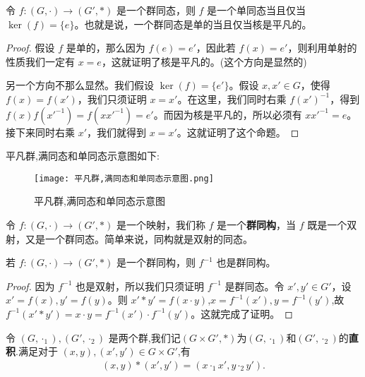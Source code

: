 \documentclass[../../main.tex]{subfiles}
\begin{document}
\begin{proposition}\label{proposition:一个群同态是单的当且仅当核是平凡的}
令 $f:(G,\cdot)\to (G',*)$ 是一个群同态，则 $f$ 是一个单同态当且仅当 $\ker(f)=\{e\}$。也就是说，一个群同态是单的当且仅当核是平凡的。
\end{proposition}
\begin{proof}
假设 $f$ 是单的，那么因为 $f(e)=e'$，因此若 $f(x)=e'$，则利用单射的性质我们一定有 $x = e$，这就证明了核是平凡的。(这个方向是显然的)

另一个方向不那么显然。我们假设 $\ker(f)=\{e'\}$。假设 $x,x'\in G$，使得 $f(x)=f(x')$，我们只须证明 $x = x'$。在这里，我们同时右乘 $f(x')^{-1}$，得到 $f(x)f(x'^{-1})=f(xx'^{-1})=e'$。而因为核是平凡的，所以必须有 $xx'^{-1}=e$。接下来同时右乘 $x'$，我们就得到 $x = x'$。这就证明了这个命题。 
\end{proof}
\begin{note}
平凡群,满同态和单同态示意图如下:
\begin{figure}[H]
\centering
\texttt{[image: 平凡群,满同态和单同态示意图.png]}
\label{figure:平凡群,满同态和单同态示意图}
\caption{平凡群,满同态和单同态示意图}
\end{figure}
\end{note}

\begin{definition}[群同构]
令 $f:(G,\cdot)\to (G',*)$ 是一个映射，我们称 $f$ 是一个\textbf{群同构}，当 $f$ 既是一个双射，又是一个群同态。简单来说，同构就是双射的同态。
\end{definition}

\begin{proposition}[群同构的逆也是群同构]
若 $f:(G,\cdot)\to (G',*)$ 是一个群同构，则 $f^{-1}$ 也是群同构。
\end{proposition}
\begin{proof}
因为 $f^{-1}$ 也是双射，所以我们只须证明 $f^{-1}$ 是群同态。令 $x',y'\in G'$，设 $x' = f(x),y' = f(y)$。则 $x'*y' = f(x\cdot y)$,$x=f^{-1}(x'),y=f^{-1}(y')$,故 $f^{-1}(x'*y')=x\cdot y = f^{-1}(x')\cdot f^{-1}(y')$。这就完成了证明。 
\end{proof}

\begin{definition}[两个群的直积]
令 $(G,\cdot_1),(G',\cdot_2)$ 是两个群,我们记$(G\times G',*)$为$(G,\cdot_1)$和$(G',\cdot_2)$的\textbf{直积}.满足对于 $(x,y),(x',y')\in G\times G'$,有
\begin{align*}
(x,y)*(x',y')=(x\cdot_1 x',y\cdot_2 y').
\end{align*}
\end{definition}
\end{document}
